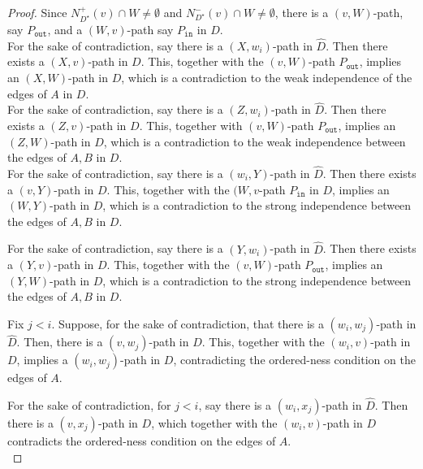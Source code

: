 \documentclass[a4paper,11pt]{article}
\newcommand{\out}{\texttt{out}}
\newcommand{\inp}{\texttt{in}}
\theoremstyle{plain}
\newtheorem{identification rule}{Identification Rule}
\theoremstyle{definition}
\theoremstyle{remark}
\begin{document}
\begin{proof}
Since  $N_{D^{\star}}^+(v) \cap W \neq \emptyset$ and $N_{D^{\star}}^-(v) \cap W \neq \emptyset$, 
there is a $(v,W)$-path, say $P_{\out}$, and a $(W,v)$-path say $P_{\inp}$ in $D$.\\

 For the sake of contradiction, say there is a $(X,w_i)$-path in $\widehat{D}$. Then there exists a $(X,v)$-path in $D$. This, together with the $(v,W)$-path $P_{\out}$, implies an $(X,W)$-path in $D$, which is a contradiction to the weak independence of the edges of $A$ in $D$.\\

 For the sake of contradiction, say there is a $(Z,w_i)$-path in $\widehat{D}$. 
Then there exists a $(Z,v)$-path in $D$. This, together with $(v,W)$-path $P_{\out}$, implies an $(Z,W)$-path in $D$, which is a contradiction to the weak independence between the edges of $A, B$ in $D$.\\

 For the sake of contradiction, 
say there is a $(w_i,Y)$-path in $\widehat{D}$. 
Then there exists a $(v,Y)$-path in $D$. This, together with the $(W,v$-path $P_{\inp}$ in $D$, implies an $(W,Y)$-path in $D$, which is a contradiction to the strong independence between the edges of $A, B$ in $D$.

For the sake of contradiction, 
say there is a $(Y,w_i)$-path in $\widehat{D}$. 
Then there exists a $(Y,v)$-path in $D$. This, together with the $(v,W)$-path $P_{\out}$, implies an $(Y,W)$-path in $D$, which is a contradiction to the strong independence between the edges of $A, B$ in $D$.

 Fix $j <i$. Suppose, for the sake of contradiction, that there is a $(w_i,w_j)$-path in $\widehat{D}$. Then, there is a $(v,w_j)$-path in $D$. This, together with the $(w_i,v)$-path in $D$, implies a $(w_i,w_j)$-path in $D$, contradicting the ordered-ness condition on the edges of $A$.

For the sake of contradiction, for $j <i$, say there is a $(w_i,x_j)$-path in $\widehat{D}$. Then there is a $(v,x_j)$-path in $D$, which together with the $(w_i,v)$-path in $D$ contradicts the ordered-ness condition on the edges of $A$.\\


\end{proof}
\end{document}
